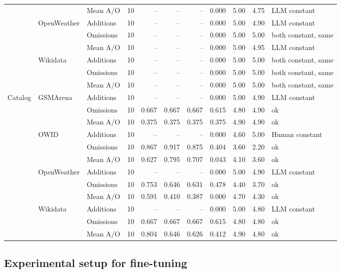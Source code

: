 \begin{table}[!htbp]
\begin{tabular}{lllrrrrrrr>{\raggedright\arraybackslash}p{42pt}}
 &  & Mean A/O & 10 & -- & -- & -- & 0.000 & 5.00 & 4.75 & LLM constant \\
 & OpenWeather & Additions & 10 & -- & -- & -- & 0.000 & 5.00 & 4.90 & LLM constant \\
 &  & Omissions & 10 & -- & -- & -- & 0.000 & 5.00 & 5.00 & both constant, same \\
 &  & Mean A/O & 10 & -- & -- & -- & 0.000 & 5.00 & 4.95 & LLM constant \\
 & Wikidata & Additions & 10 & -- & -- & -- & 0.000 & 5.00 & 5.00 & both constant, same \\
 &  & Omissions & 10 & -- & -- & -- & 0.000 & 5.00 & 5.00 & both constant, same \\
 &  & Mean A/O & 10 & -- & -- & -- & 0.000 & 5.00 & 5.00 & both constant, same \\
\hline
Catalog & GSMArena & Additions & 10 & -- & -- & -- & 0.000 & 5.00 & 4.90 & LLM constant \\
 &  & Omissions & 10 & 0.667 & 0.667 & 0.667 & 0.615 & 4.80 & 4.90 & ok \\
 &  & Mean A/O & 10 & 0.375 & 0.375 & 0.375 & 0.375 & 4.90 & 4.90 & ok \\
 & OWID & Additions & 10 & -- & -- & -- & 0.000 & 4.60 & 5.00 & Human constant \\
 &  & Omissions & 10 & 0.867 & 0.917 & 0.875 & 0.404 & 3.60 & 2.20 & ok \\
 &  & Mean A/O & 10 & 0.627 & 0.795 & 0.707 & 0.043 & 4.10 & 3.60 & ok \\
 & OpenWeather & Additions & 10 & -- & -- & -- & 0.000 & 5.00 & 4.90 & LLM constant \\
 &  & Omissions & 10 & 0.753 & 0.646 & 0.631 & 0.478 & 4.40 & 3.70 & ok \\
 &  & Mean A/O & 10 & 0.591 & 0.410 & 0.387 & 0.000 & 4.70 & 4.30 & ok \\
 & Wikidata & Additions & 10 & -- & -- & -- & 0.000 & 5.00 & 4.80 & LLM constant \\
 &  & Omissions & 10 & 0.667 & 0.667 & 0.667 & 0.615 & 4.80 & 4.80 & ok \\
 &  & Mean A/O & 10 & 0.804 & 0.646 & 0.626 & 0.412 & 4.90 & 4.80 & ok \\
\hline
\end{tabular}
\end{table}

\FloatBarrier
\subsection{Experimental setup for fine-tuning}

